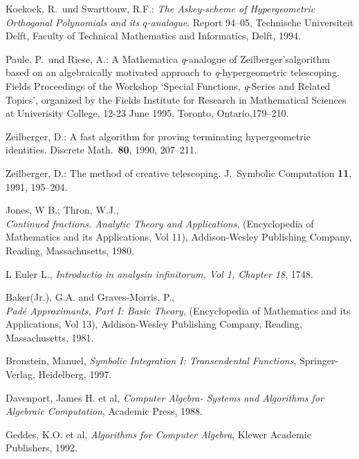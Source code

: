 \begin{thebibliography}{999}
Koekoek, R.\ und Swarttouw, R.F.:
{\sl The Askey-scheme of Hypergeometric Orthogonal
Polynomials and its $q$-analogue}. Report 94--05, Tech\-nische Universiteit
Delft, Faculty of Technical Mathematics and Informatics, Delft, 1994.


Paule, P.\ und Riese, A.:
A Mathematica \textsl{q}-analogue of Zeilberger's\linebreak[4]
algorithm based on an
algebraically motivated approach to \textsl{q}-hyper\-geometric telescoping.
Fields Proceedings of the Workshop `Special Functions, \textsl{q}-Series
and Related Topics', organized by the Fields Institute for Research in
Mathematical Sciences at Univerisity College,
12-23 June 1995, Toronto, Ontario,179--210.

Zeilberger, D.:
A fast algorithm for proving terminating hypergeometric identities.
Discrete Math.\ \textbf{80}, 1990, 207--211.

Zeilberger, D.:
The method of creative telescoping.
J.\ Symbolic Computation \textbf{11}, 1991, 195--204.


 Jones, W B.; Thron, W.J., \\
\textit{Continued fractions. Analytic Theory and Applications},
 (Encyclopedia of Mathematics and its Applications, Vol 11),
Addison-Wesley Publishing Company, Reading, Massachusetts, 1980.

 L Euler L., \textit{Introductio in analysin infinitorum, Vol 1,
 Chapter 18}, 1748.

 Baker(Jr.), G.A. and Graves-Morris, P.,\\
\textit{Pad\'{e} Approximants, Part I: Basic Theory},
(Encyclopedia of Mathematics and its Applications, Vol 13),
Addison-Wesley Publishing Company, Reading, Massachusetts, 1981.


 Bronstein, Manuel,
{\it Symbolic Integration I: Transendental Functions},
Springer-Verlag, Heidelberg, 1997.

 Davenport, James H. et al,
{\it Computer Algebra- Systems and Algorithms for Algebraic Computation},
Academic Press, 1988.

 Geddes, K.O. et al,
{\it Algorithms for Computer Algebra}, Klewer Academic \mbox{Publishers}, 1992.


\end{thebibliography}
